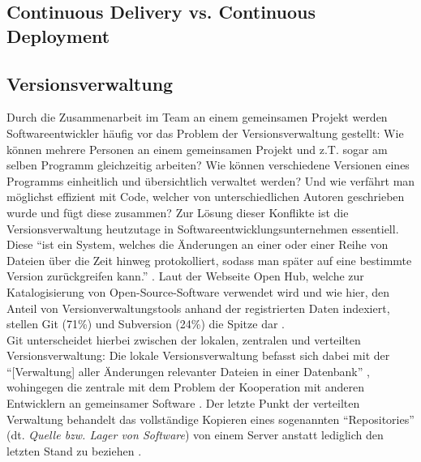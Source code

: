 \subsection{Continuous Delivery vs. Continuous Deployment}

\subsection{Versionsverwaltung}
Durch die Zusammenarbeit im Team an einem gemeinsamen Projekt werden Softwareentwickler häufig vor das Problem der Versionsverwaltung gestellt: Wie können mehrere Personen an einem gemeinsamen Projekt und z.T. sogar am selben Programm gleichzeitig arbeiten?
Wie können verschiedene Versionen eines Programms einheitlich und übersichtlich verwaltet werden? Und wie verfährt man möglichst effizient mit Code, welcher von unterschiedlichen Autoren geschrieben wurde und fügt diese zusammen? Zur Lösung dieser Konflikte 
ist die Versionsverwaltung heutzutage in Softwareentwicklungsunternehmen essentiell. Diese \enquote{ist ein System, welches die Änderungen an einer oder einer Reihe von Dateien über die Zeit hinweg protokolliert, sodass man später auf eine bestimmte Version 
zurückgreifen kann.} \cite{Scott-Chacon:2020aa}. Laut der Webseite Open Hub, welche zur Katalogisierung von Open-Source-Software verwendet wird und wie hier, den Anteil von Versionverwaltungstools anhand der registrierten Daten indexiert, stellen Git (71\%) 
und Subversion (24\%) die Spitze dar \cite{Inc.:2020aa}. \\
Git unterscheidet hierbei zwischen der lokalen, zentralen und verteilten Versionsverwaltung: Die lokale Versionsverwaltung befasst sich dabei mit der \enquote{[Verwaltung] aller Änderungen relevanter Dateien in einer Datenbank} \cite{Scott-Chacon:2020aa}, wohingegen die
zentrale mit dem Problem der Kooperation mit anderen Entwicklern an gemeinsamer Software \cite{Scott-Chacon:2020aa}. Der letzte Punkt der verteilten Verwaltung behandelt das vollständige Kopieren eines sogenannten \enquote{Repositories} (dt. \textit{Quelle bzw. Lager von Software})
von einem Server anstatt lediglich den letzten Stand zu beziehen \cite{Scott-Chacon:2020aa}.